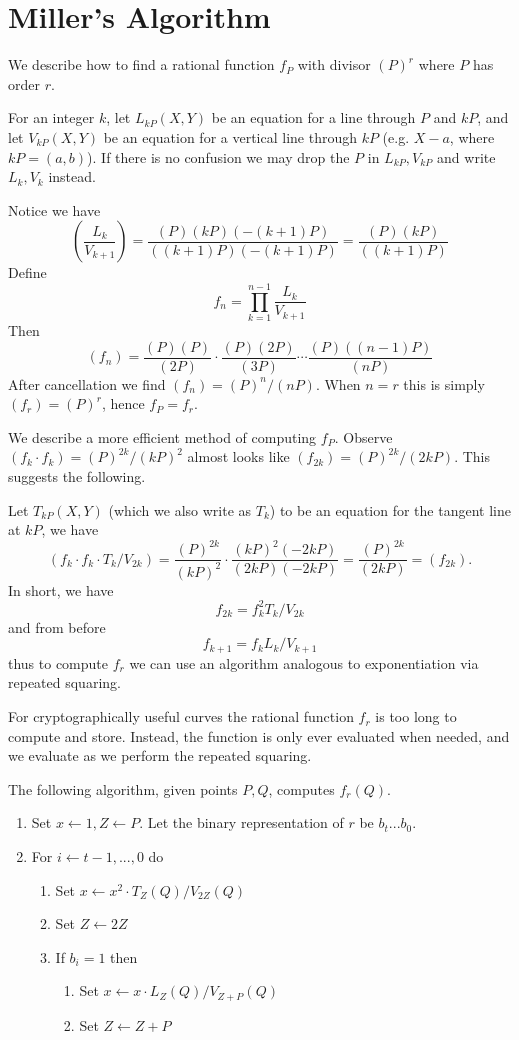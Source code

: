 \section {Miller's Algorithm}

We describe how to find a rational function $f_P$ with divisor
$(P)^r$ \cite{miller} where $P$ has order $r$.

For an integer $k$,
let $L_{kP}(X,Y)$ be an equation for a line through $P$ and $kP$,
and let
$V_{kP}(X,Y)$ be an equation for a vertical line through $kP$ (e.g.
$X - a$, where $kP = (a, b)$).
If there is no confusion we may drop the $P$ in $L_{kP}, V_{kP}$ and write
$L_k, V_k$ instead.

Notice we have
\[
\left (
\frac{L_k}{V_{k+1}}
\right )
= \frac{(P)(kP)(-(k+1)P)}{((k+1)P)(-(k+1)P)}
= \frac{(P)(kP)}{((k+1)P)}
\]
Define
\[ f_n = \prod_{k=1}^{n-1} \frac{L_k}{V_{k+1}} \]
Then
\[ (f_n) =
\frac{(P)(P)}{(2P)}
\cdot
\frac{(P)(2P)}{(3P)}
\cdots
\frac{(P)((n-1)P)}{(nP)}
\]
After cancellation we find $(f_n) = (P)^n / (nP)$. When $n = r$ this
is simply $(f_r) = (P)^r$, hence $f_P = f_r$.

We describe a more efficient method of computing $f_P$.
Observe $(f_k \cdot f_k) = {(P)^{2k}}/{(kP)^2}$
almost looks like $(f_{2k}) = {(P)^{2k}}/{(2kP)}$.
This suggests the following.

Let $T_{kP}(X,Y)$ (which we also write as $T_k$)
to be an equation for the tangent line at $kP$,
we have
\[
(f_k \cdot f_k \cdot T_k / V_{2k} ) = \frac{(P)^{2k}}{(kP)^2} \cdot
\frac{(kP)^2 (-2kP)}{(2kP)(-2kP)} = \frac{(P)^{2k}}{(2kP)} = (f_{2k}) .
\]
In short, we have
\[
f_{2k} = f_k^2 T_k / V_{2k}
\]
and from before
\[
f_{k+1} = f_k L_{k} / V_{k+1}
\]
thus to compute $f_r$ we can use an algorithm analogous to exponentiation via
repeated squaring.

For cryptographically useful curves the rational function $f_r$
is too long to compute and store. Instead, the function is only ever
evaluated when needed, and we evaluate as we perform the repeated
squaring.

The following algorithm, given points $P, Q$, computes
$f_r(Q)$.

\begin{enumerate}
\item
Set $x \leftarrow 1, Z \leftarrow P$.
Let the binary representation of $r$ be $b_t ... b_0$.
\item
For $i \leftarrow t-1, ..., 0$ do
    \begin{enumerate}
    \item
    Set $x \leftarrow x^2 \cdot T_Z(Q) / V_{2Z}(Q)$
    \item
    Set $Z \leftarrow 2Z$
    \item
    If $b_i = 1$ then
	\begin{enumerate}
	\item
	Set $x \leftarrow x \cdot L_{Z}(Q) / V_{Z+P}(Q)$
	\item
	Set $Z \leftarrow Z + P$
	\end{enumerate}
    \end{enumerate}
\end{enumerate}

